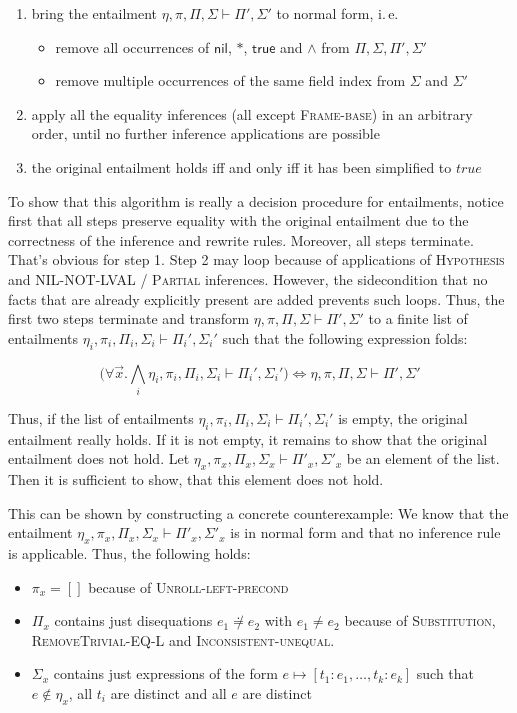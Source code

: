 \documentclass{scrartcl}
\theoremstyle{definition}
\newcommand{\nil}{{\textsf{nil}}}
\newcommand{\pftrue}{{\textsf{true}}}
\newcommand{\pfunequal}[2]{\ensuremath{#1 \not\doteq #2}}
\newcommand{\sfpointsto}[2]{#1 \mapsto [#2]}
\begin{document}
\begin{enumerate}
\item bring the entailment ${\eta,\pi,\Pi,\Sigma}\vdash{\Pi',\Sigma'}$ to
  normal form, i.\,e.\:
  \begin{itemize}
  \item remove all occurrences of $\nil$, $*$, $\pftrue$ and $\wedge$ from
    $\Pi, \Sigma, \Pi', \Sigma'$ 
  \item remove multiple occurrences of the same field index from $\Sigma$ and $\Sigma'$
  \end{itemize}
\item apply all the equality inferences (all except \textsc{Frame-base}) in an
  arbitrary order, until no further inference applications are possible
\item the original entailment holds iff and only iff it has been simplified to $\textit{true}$
\end{enumerate}

To show that this algorithm is really a decision procedure for entailments,
notice first that all steps preserve equality with the original entailment due
to the correctness of the inference and rewrite rules. Moreover, all steps
terminate. That's obvious for step 1. Step 2 may loop because of applications
of \textsc{Hypothesis} and \textsc{NIL-NOT-LVAL} / \textsc{Partial}
inferences. However, the sidecondition that no facts that are already
explicitly present are added prevents such loops.  Thus, the first two steps
terminate and transform ${\eta,\pi,\Pi,\Sigma}\vdash{\Pi',\Sigma'}$ to a
finite list of entailments
${\eta_i,\pi_i,\Pi_i,\Sigma_i}\vdash{\Pi_i',\Sigma_i'}$ such that the
following expression folds:

\[\big(\forall \vec{x}. \bigwedge_i
{\eta_i,\pi_i,\Pi_i,\Sigma_i}\vdash{\Pi_i',\Sigma_i'}\big) \Longleftrightarrow
{\eta,\pi,\Pi,\Sigma}\vdash{\Pi',\Sigma'}
\]


Thus, if the list of entailments
${\eta_i,\pi_i,\Pi_i,\Sigma_i}\vdash{\Pi_i',\Sigma_i'}$ is empty, the original
entailment really holds. If it is not empty, it remains to show that 
the original entailment does not hold. Let 
${\eta_x,\pi_x,\Pi_x,\Sigma_x}\vdash{\Pi'_x,\Sigma'_x}$ be an element of the
list. Then it is sufficient to show, that this element does not hold.

This can be shown by constructing a concrete counterexample: We know that the
entailment ${\eta_x,\pi_x,\Pi_x,\Sigma_x}\vdash{\Pi'_x,\Sigma'_x}$ is in
normal form and that no inference rule is applicable. Thus, the following
holds:
\begin{itemize}
\item $\pi_x = []$ because of \textsc{Unroll-left-precond}
\item $\Pi_x$ contains just disequations $\pfunequal {e_1} {e_2}$ with $e_1
  \not = e_2$ because of \textsc{Substitution}, \textsc{RemoveTrivial-EQ-L} and \textsc{Inconsistent-unequal}.
\item $\Sigma_x$ contains just expressions of the form $\sfpointsto e
  {t_1:e_1, \ldots, t_k:e_k}$ such that $e \not\in \eta_x$, all $t_i$ are
  distinct and all $e$ are distinct
\end{itemize}
\end{document}
